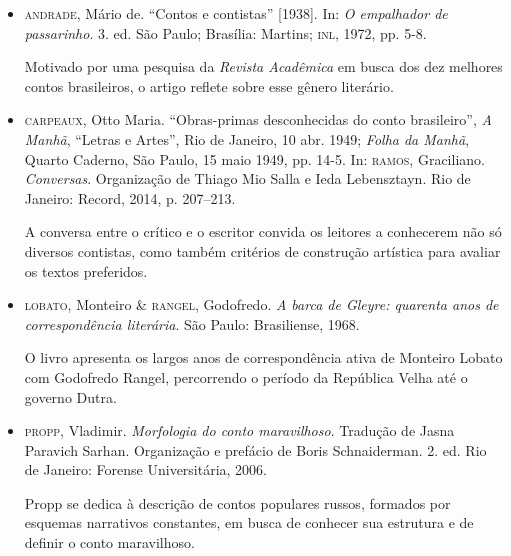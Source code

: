 \documentclass[11pt]{extarticle}
\begin{document}
\begin{itemize}
\item  \textsc{andrade}, Mário de. ``Contos e contistas'' {[}1938{]}. In: \emph{O
empalhador de passarinho}. 3. ed. São Paulo; Brasília: Martins; \textsc{inl},
1972, pp. 5-8. 

Motivado por uma pesquisa da \emph{Revista Acadêmica} em
busca dos dez melhores contos brasileiros, o artigo reflete sobre esse
gênero literário.

\item  \textsc{carpeaux}, Otto Maria. ``Obras-primas desconhecidas do conto
brasileiro'', \emph{A Manhã}, ``Letras e Artes'', Rio de Janeiro, 10
abr. 1949; \emph{Folha da Manhã}, Quarto Caderno, São Paulo, 15 maio
1949, pp. 14-5. In: \textsc{ramos}, Graciliano. \emph{Conversas}. Organização de
Thiago Mio Salla e Ieda Lebensztayn. Rio de Janeiro: Record, 2014, p.
207--213. 

A conversa entre o crítico e o escritor convida os leitores a
conhecerem não só diversos contistas, como também critérios de
construção artística para avaliar os textos preferidos.

\item \textsc{lobato}, Monteiro \& \textsc{rangel}, Godofredo. \emph{A barca de Gleyre: quarenta
anos de correspondência literária}. São Paulo: Brasiliense, 1968.

O livro apresenta os largos anos de correspondência ativa de Monteiro Lobato com Godofredo 
Rangel, percorrendo o período da República Velha até o governo Dutra.

\item \textsc{propp}, Vladimir. \emph{Morfologia do conto maravilhoso}. Tradução de
Jasna Paravich Sarhan. Organização e prefácio de Boris Schnaiderman. 2.
ed. Rio de Janeiro: Forense Universitária, 2006. 

Propp se dedica à descrição de contos populares russos, formados por esquemas narrativos
constantes, em busca de conhecer sua estrutura e de definir o conto
maravilhoso.
\end{itemize}
\end{document}
